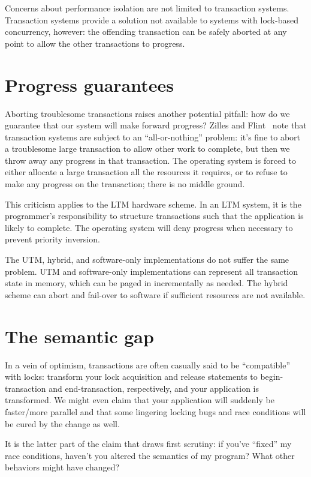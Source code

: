 Concerns about performance isolation are not limited to transaction
systems.  Transaction systems provide a solution not available to
systems with lock-based concurrency, however: the offending
transaction can be safely aborted at any point to allow the other
transactions to progress.

\section{Progress guarantees}\label{sec:progress}
Aborting troublesome transactions raises another potential pitfall:
how do we guarantee that our system will make forward progress?
Zilles and Flint~\cite{ZillesFl05} note that transaction systems are
subject to an ``all-or-nothing'' problem: it's fine to abort a
troublesome large transaction to allow other work to complete, but
then we throw away any progress in that transaction.  The operating
system is forced to either allocate a large transaction all the
resources it requires, or to refuse to make any progress on the
transaction; there is no middle ground.

This criticism applies to the LTM hardware scheme.  In an LTM system, it is the
programmer's responsibility to structure transactions such that the
application is likely to complete.  The operating system will deny
progress when necessary to prevent priority inversion.

The UTM, hybrid, and software-only implementations do not suffer the
same problem.  UTM and software-only implementations can represent all
transaction state in memory, which can be paged in incrementally as
needed.  The hybrid scheme can abort and fail-over to software if
sufficient resources are not available.

\section{The semantic gap}\label{sec:semantic}
In a vein of optimism, transactions are often casually said to be
``compatible'' with locks: transform your lock acquisition and release
statements to begin-transaction and end-transaction, respectively, and
your application is transformed.  We might even claim that your
application will suddenly be faster/more parallel and that some
lingering locking bugs and race conditions will be cured by the change
as well.

It is the latter part of the claim that draws first scrutiny: if
you've ``fixed'' my race conditions, haven't you altered the semantics
of my program?  What other behaviors might have changed?

